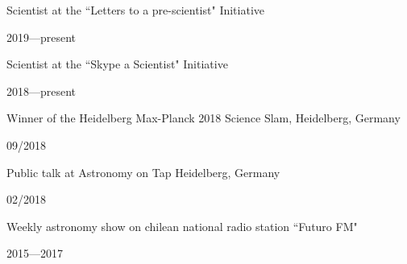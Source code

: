 \documentclass[12pt, a4paper]{article} %
\begin{document}
\vspace{0.2cm}

\begin{minipage}[t]{0.7\textwidth}
\begin{flushleft}%
  \setlength{\leftskip}{0.2cm}%
Scientist at the ``Letters to a pre-scientist" Initiative
\end{flushleft}
\end{minipage}
\begin{minipage}[t]{0.3\textwidth}
\hfill 2019---present
\end{minipage}

\vspace{0.2cm}

\begin{minipage}[t]{0.7\textwidth}
\begin{flushleft}%
  \setlength{\leftskip}{0.2cm}%
Scientist at the ``Skype a Scientist" Initiative
\end{flushleft}
\end{minipage}
\begin{minipage}[t]{0.3\textwidth}
\hfill 2018---present
\end{minipage}

\vspace{0.2cm}

\begin{minipage}[t]{0.7\textwidth}
\begin{flushleft}%
  \setlength{\leftskip}{0.2cm}%
Winner of the Heidelberg Max-Planck 2018 Science Slam, Heidelberg, Germany 
\end{flushleft}
\end{minipage}
\begin{minipage}[t]{0.3\textwidth}
\hfill 09/2018
\end{minipage}

\vspace{0.2cm}

\begin{minipage}[t]{0.7\textwidth}
\begin{flushleft}%
  \setlength{\leftskip}{0.2cm}%
Public talk at Astronomy on Tap Heidelberg, Germany 
\end{flushleft}
\end{minipage}
\begin{minipage}[t]{0.3\textwidth}
\hfill 02/2018
\end{minipage}

\vspace{0.2cm}

\begin{minipage}[t]{0.7\textwidth}
\begin{flushleft}%
  \setlength{\leftskip}{0.2cm}%
Weekly astronomy show on chilean national radio station ``Futuro FM"
\end{flushleft}
\end{minipage}
\begin{minipage}[t]{0.3\textwidth}
\hfill 2015---2017
\end{minipage}
\end{document}
